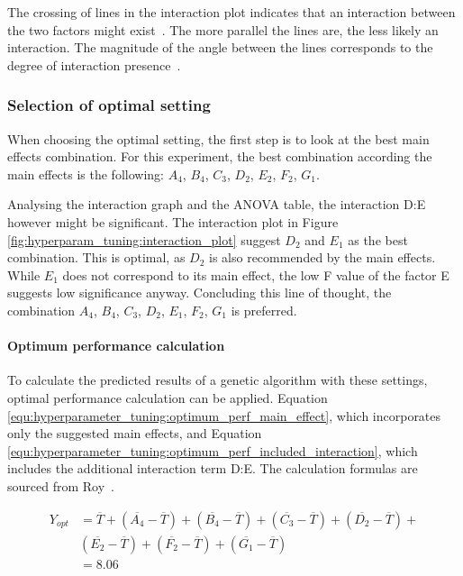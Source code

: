 The crossing of lines in the interaction plot indicates that an interaction between the two factors might exist~\cite{field_discovering_2012}. The more parallel the lines are, the less likely an interaction. The magnitude of the angle between the lines corresponds to the degree of interaction presence~\cite{roy_primer_1990}.

\subsubsection{Selection of optimal setting}
When choosing the optimal setting, the first step is to look at the best main effects combination. For this experiment, the best combination according the main effects is the following: $A_4$, $B_4$, $C_3$, $D_2$, $E_2$, $F_2$, $G_1$.

Analysing the interaction graph and the ANOVA table, the interaction D:E however might be significant. The interaction plot in Figure \ref{fig:hyperparam_tuning:interaction_plot} suggest $D_2$ and $E_1$ as the best combination. This is optimal, as $D_2$ is also recommended by the main effects. While $E_1$ does not correspond to its main effect, the low F value of the factor E suggests low significance anyway. Concluding this line of thought, the combination $A_4$, $B_4$, $C_3$, $D_2$, $E_1$, $F_2$, $G_1$ is preferred.

\paragraph{Optimum performance calculation}
\label{sect:hyperparameter_tuning:optimum_perf_caluclation}
To calculate the predicted results of a genetic algorithm with these settings, optimal performance calculation can be applied. Equation \ref{equ:hyperparameter_tuning:optimum_perf_main_effect}, which incorporates only the suggested main effects, and Equation \ref{equ:hyperparameter_tuning:optimum_perf_included_interaction}, which includes the additional interaction term D:E. The calculation formulas are sourced from Roy~\cite{roy_primer_1990}.

\begin{equation}
	\begin{split}
		Y_{opt} &= \overline{T} + (\overline{A_4} - \overline{T}) + (\overline{B_4} - \overline{T}) + (\overline{C_3} - \overline{T}) + (\overline{D_2} - \overline{T}) + \\& (\overline{E_2} - \overline{T}) + (\overline{F_2} - \overline{T}) + (\overline{G_1} - \overline{T}) \\
			&= 8.06
	\end{split}
	 \label{equ:hyperparameter_tuning:optimum_perf_main_effect}
\end{equation}


